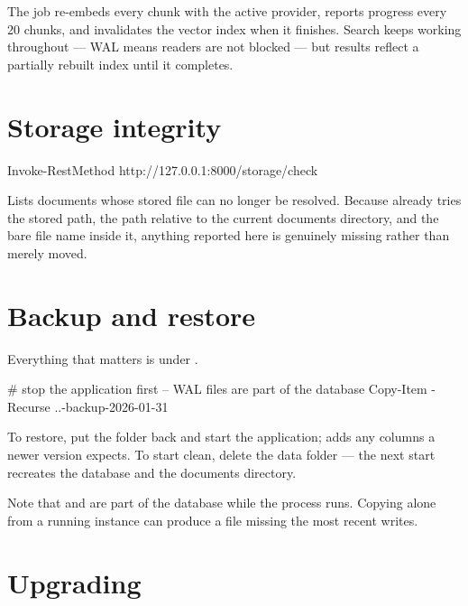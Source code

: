 
The job re-embeds every chunk with the active provider, reports progress every
20 chunks, and invalidates the vector index when it finishes. Search keeps
working throughout --- WAL means readers are not blocked --- but results reflect
a partially rebuilt index until it completes.

\section{Storage integrity}

\begin{shellblock}
Invoke-RestMethod http://127.0.0.1:8000/storage/check
\end{shellblock}

Lists documents whose stored file can no longer be resolved. Because
 already tries the stored path, the path
relative to the current documents directory, and the bare file name inside it,
anything reported here is genuinely missing rather than merely moved.

\section{Backup and restore}

Everything that matters is under .

\begin{shellblock}
# stop the application first -- WAL files are part of the database
Copy-Item -Recurse .\data .\data-backup-2026-01-31
\end{shellblock}

To restore, put the folder back and start the application; 
adds any columns a newer version expects. To start clean, delete the data folder
--- the next start recreates the database and the documents directory.

Note that  and  are part of the
database while the process runs. Copying  alone from a running
instance can produce a file missing the most recent writes.

\section{Upgrading}

